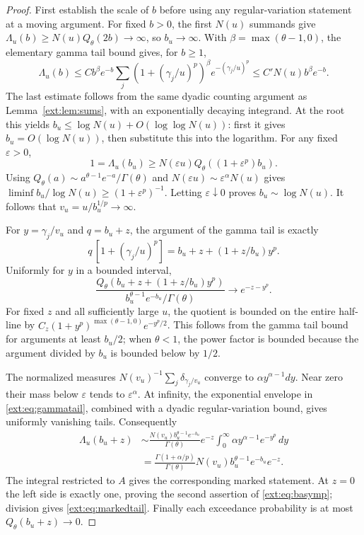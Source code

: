 \documentclass[11pt]{article}
\theoremstyle{definition}
\theoremstyle{remark}
\begin{document}
\begin{proof}
First establish the scale of $b$ before using any regular-variation
statement at a moving argument.  For fixed $b>0$, the first $N(u)$
summands give $\Lambda_u(b)\ge N(u)Q_\theta(2b)\to\infty$, so
$b_u\to\infty$.  With $\beta=\max(\theta-1,0)$, the elementary gamma
tail bound gives, for $b\ge1$,
\[
 \Lambda_u(b)\le C b^\beta e^{-b}
 \sum_j(1+(\gamma_j/u)^p)^\beta e^{-(\gamma_j/u)^p}
 \le C' N(u)b^\beta e^{-b}.
\]
The last estimate follows from the same dyadic counting argument as
Lemma~\ref{ext:lem:sums}, with an exponentially decaying integrand.
At the root this yields
$b_u\le\log N(u)+O(\log\log N(u))$: first it gives
$b_u=O(\log N(u))$, then substitute this into the logarithm.
For any fixed $\varepsilon>0$,
\[
 1=\Lambda_u(b_u)\ge
 N(\varepsilon u)Q_\theta((1+\varepsilon^p)b_u).
\]
Using $Q_\theta(a)\sim a^{\theta-1}e^{-a}/\Gamma(\theta)$ and
$N(\varepsilon u)\sim\varepsilon^\alpha N(u)$ gives
$\liminf b_u/\log N(u)\ge(1+\varepsilon^p)^{-1}$.
Letting $\varepsilon\downarrow0$ proves $b_u\sim\log N(u)$.
It follows that $v_u=u/b_u^{1/p}\to\infty$.

For $y=\gamma_j/v_u$ and $q=b_u+z$, the argument of the gamma tail is
exactly
\[
 q\,[1+(\gamma_j/u)^p]
       =b_u+z+(1+z/b_u)y^p.
\]
Uniformly for $y$ in a bounded interval,
\begin{equation}\label{ext:eq:gammatail}
 \frac{Q_\theta(b_u+z+(1+z/b_u)y^p)}
      {b_u^{\theta-1}e^{-b_u}/\Gamma(\theta)}
       \longrightarrow e^{-z-y^p}.
\end{equation}
For fixed $z$ and all sufficiently large $u$, the quotient is bounded
on the entire half-line by
$C_z(1+y^p)^{\max(\theta-1,0)}e^{-y^p/2}$.
This follows from the gamma tail bound for arguments at least $b_u/2$;
when $\theta<1$, the power factor is bounded because the argument divided
by $b_u$ is bounded below by $1/2$.

The normalized measures
$N(v_u)^{-1}\sum_j\delta_{\gamma_j/v_u}$ converge to
$\alpha y^{\alpha-1}dy$.  Near zero their mass below $\varepsilon$
tends to $\varepsilon^\alpha$.  At infinity, the exponential envelope
in \eqref{ext:eq:gammatail}, combined with a dyadic regular-variation
bound, gives uniformly vanishing tails.  Consequently
\begin{align*}
 \Lambda_u(b_u+z)
 &\sim\frac{N(v_u)b_u^{\theta-1}e^{-b_u}}{\Gamma(\theta)}
       e^{-z}\int_0^\infty\alpha y^{\alpha-1}e^{-y^p}\,dy\\
 &=\frac{\Gamma(1+\alpha/p)}{\Gamma(\theta)}
       N(v_u)b_u^{\theta-1}e^{-b_u}e^{-z}.
\end{align*}
The integral restricted to $A$ gives the corresponding marked statement.
At $z=0$ the left side is exactly one, proving the second assertion of
\eqref{ext:eq:basymp}; division gives \eqref{ext:eq:markedtail}.
Finally each exceedance probability is at most $Q_\theta(b_u+z)\to0$.
\end{proof}
\end{document}
